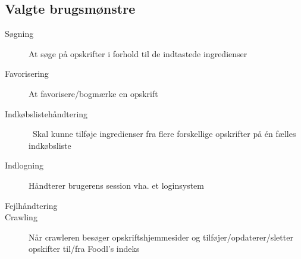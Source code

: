 \subsection{Valgte brugsmønstre}

\begin{description}
  \item[Søgning] At søge på opskrifter i forhold til de indtastede ingredienser

  \item[Favorisering] At favorisere/bogmærke en opskrift

  \item[Indkøbslistehåndtering] Skal kunne tilføje ingredienser fra flere forskellige opskrifter på én fælles indkøbsliste

  \item[Indlogning] Håndterer brugerens session vha. et loginsystem

  \item[Fejlhåndtering]

  \item[Crawling] Når crawleren besøger opskriftshjemmesider og tilføjer/opdaterer/sletter opskifter til/fra Foodl’s indeks
\end{description}


